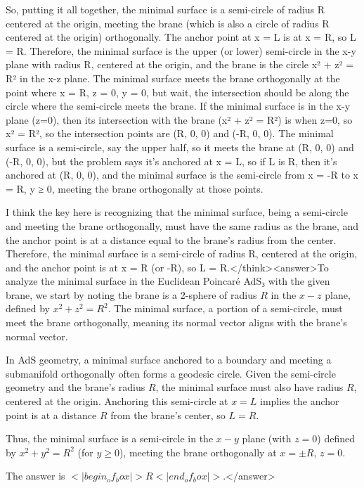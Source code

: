 So, putting it all together, the minimal surface is a semi-circle of radius R centered at the origin, meeting the brane (which is also a circle of radius R centered at the origin) orthogonally. The anchor point at x = L is at x = R, so L = R. Therefore, the minimal surface is the upper (or lower) semi-circle in the x-y plane with radius R, centered at the origin, and the brane is the circle x² + z² = R² in the x-z plane. The minimal surface meets the brane orthogonally at the point where x = R, z = 0, y = 0, but wait, the intersection should be along the circle where the semi-circle meets the brane. If the minimal surface is in the x-y plane (z=0), then its intersection with the brane (x² + z² = R²) is when z=0, so x² = R², so the intersection points are (R, 0, 0) and (-R, 0, 0). The minimal surface is a semi-circle, say the upper half, so it meets the brane at (R, 0, 0) and (-R, 0, 0), but the problem says it's anchored at x = L, so if L is R, then it's anchored at (R, 0, 0), and the minimal surface is the semi-circle from x = -R to x = R, y ≥ 0, meeting the brane orthogonally at those points. 

I think the key here is recognizing that the minimal surface, being a semi-circle and meeting the brane orthogonally, must have the same radius as the brane, and the anchor point is at a distance equal to the brane's radius from the center. Therefore, the minimal surface is a semi-circle of radius R, centered at the origin, and the anchor point is at x = R (or -R), so L = R.</think><answer>To analyze the minimal surface in the Euclidean Poincaré AdS₃ with the given brane, we start by noting the brane is a 2-sphere of radius \( R \) in the \( x-z \) plane, defined by \( x^2 + z^2 = R^2 \). The minimal surface, a portion of a semi-circle, must meet the brane orthogonally, meaning its normal vector aligns with the brane's normal vector.  

In AdS geometry, a minimal surface anchored to a boundary and meeting a submanifold orthogonally often forms a geodesic circle. Given the semi-circle geometry and the brane's radius \( R \), the minimal surface must also have radius \( R \), centered at the origin. Anchoring this semi-circle at \( x = L \) implies the anchor point is at a distance \( R \) from the brane's center, so \( L = R \).  

Thus, the minimal surface is a semi-circle in the \( x-y \) plane (with \( z = 0 \)) defined by \( x^2 + y^2 = R^2 \) (for \( y \geq 0 \)), meeting the brane orthogonally at \( x = \pm R \), \( z = 0 \).  

The answer is \(<|begin_of_box|>R<|end_of_box|>\).</answer>